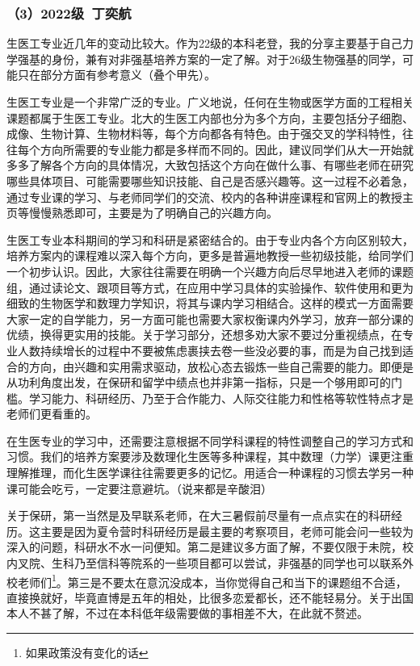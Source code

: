 \subsubsection{（3）2022级\ 丁奕航}

生医工专业近几年的变动比较大。作为22级的本科老登，我的分享主要基于自己力学强基的身份，兼有对非强基培养方案的一定了解。对于26级生物强基的同学，可能只在部分方面有参考意义（叠个甲先）。

\vspace{10pt}

生医工专业是一个非常广泛的专业。广义地说，任何在生物或医学方面的工程相关课题都属于生医工专业。北大的生医工内部也分为多个方向，主要包括分子细胞、成像、生物计算、生物材料等，每个方向都各有特色。由于强交叉的学科特性，往往每个方向所需要的专业能力都是多样而不同的。因此，建议同学们从大一开始就多多了解各个方向的具体情况，大致包括这个方向在做什么事、有哪些老师在研究哪些具体项目、可能需要哪些知识技能、自己是否感兴趣等。这一过程不必着急，通过专业课的学习、与老师同学们的交流、校内的各种讲座课程和官网上的教授主页等慢慢熟悉即可，主要是为了明确自己的兴趣方向。

\vspace{10pt}

生医工专业本科期间的学习和科研是紧密结合的。由于专业内各个方向区别较大，培养方案内的课程难以深入每个方向，更多是普遍地教授一些初级技能，给同学们一个初步认识。因此，大家往往需要在明确一个兴趣方向后尽早地进入老师的课题组，通过读论文、跟项目等方式，在应用中学习具体的实验操作、软件使用和更为细致的生物医学和数理力学知识，将其与课内学习相结合。这样的模式一方面需要大家一定的自学能力，另一方面可能也需要大家权衡课内外学习，放弃一部分课的优绩，换得更实用的技能。关于学习部分，还想多劝大家不要过分重视绩点，在专业人数持续增长的过程中不要被焦虑裹挟去卷一些没必要的事，而是为自己找到适合的方向，由兴趣和实用需求驱动，放松心态去锻炼一些自己需要的能力。即便是从功利角度出发，在保研和留学中绩点也并非第一指标，只是一个够用即可的门槛。学习能力、科研经历、乃至于合作能力、人际交往能力和性格等软性特点才是老师们更看重的。

\vspace{10pt}

在生医专业的学习中，还需要注意根据不同学科课程的特性调整自己的学习方式和习惯。我们的培养方案要涉及数理化生医等多种课程，其中数理（力学）课更注重理解推理，而化生医学课往往需要更多的记忆。用适合一种课程的习惯去学另一种课可能会吃亏，一定要注意避坑。（说来都是辛酸泪）

\vspace{10pt}

关于保研，第一当然是及早联系老师，在大三暑假前尽量有一点点实在的科研经历。这主要是因为夏令营时科研经历是最主要的考察项目，老师可能会问一些较为深入的问题，科研水不水一问便知。第二是建议多方面了解，不要仅限于未院，校内叉院、生科乃至信科等院系的一些项目都可以尝试，非强基的同学也可以联系外校老师们\footnote{如果政策没有变化的话}。第三是不要太在意沉没成本，当你觉得自己和当下的课题组不合适，直接换就好，毕竟直博是五年的相处，比很多恋爱都长，还不能轻易分。关于出国本人不甚了解，不过在本科低年级需要做的事相差不大，在此就不赘述。

